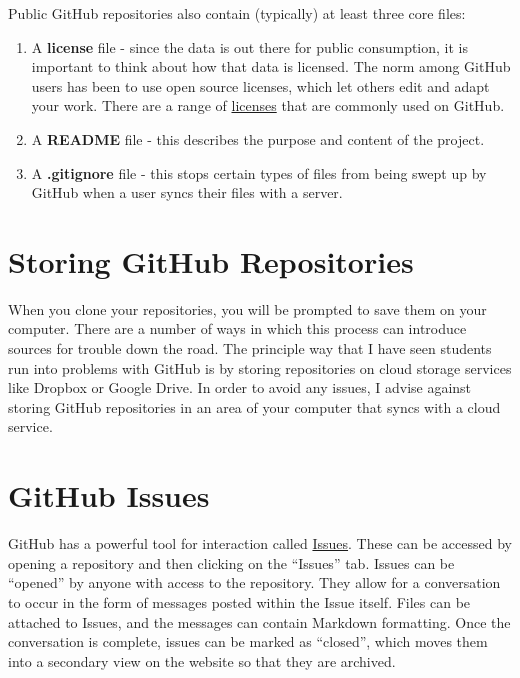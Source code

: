 \documentclass[]{book}
\theoremstyle{definition}
\theoremstyle{definition}
\theoremstyle{definition}
\theoremstyle{remark}
\begin{document}
Public GitHub repositories also contain (typically) at least three core
files:

\begin{enumerate}
\def\labelenumi{\arabic{enumi}.}
\item
  A \textbf{license} file - since the data is out there for public
  consumption, it is important to think about how that data is licensed.
  The norm among GitHub users has been to use open source licenses,
  which let others edit and adapt your work. There are a range of
  \href{http://choosealicense.com}{licenses} that are commonly used on
  GitHub.
\item
  A \textbf{README} file - this describes the purpose and content of the
  project.
\item
  A \textbf{.gitignore} file - this stops certain types of files from
  being swept up by GitHub when a user syncs their files with a server.
\end{enumerate}

\section{Storing GitHub Repositories}\label{storing-github-repositories}

When you clone your repositories, you will be prompted to save them on
your computer. There are a number of ways in which this process can
introduce sources for trouble down the road. The principle way that I
have seen students run into problems with GitHub is by storing
repositories on cloud storage services like Dropbox or Google Drive. In
order to avoid any issues, I advise against storing GitHub repositories
in an area of your computer that syncs with a cloud service.

\section{GitHub Issues}\label{github-issues}

GitHub has a powerful tool for interaction called
\href{https://help.github.com/articles/about-issues/}{Issues}. These can
be accessed by opening a repository and then clicking on the ``Issues''
tab. Issues can be ``opened'' by anyone with access to the repository.
They allow for a conversation to occur in the form of messages posted
within the Issue itself. Files can be attached to Issues, and the
messages can contain Markdown formatting. Once the conversation is
complete, issues can be marked as ``closed'', which moves them into a
secondary view on the website so that they are archived.
\end{document}

